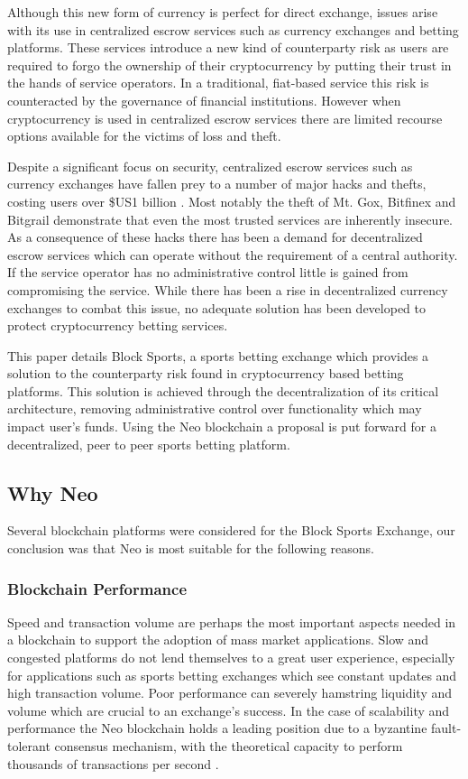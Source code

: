 \documentclass{article}
\begin{document}
Although this new form of currency is perfect for direct exchange, issues arise with its use in centralized escrow services such as currency exchanges and betting platforms. These services introduce a new kind of counterparty risk as users are required to forgo the ownership of their cryptocurrency by putting their trust in the hands of service operators. In a traditional, fiat-based service this risk is counteracted by the governance of financial institutions. However when cryptocurrency is used in centralized escrow services there are limited recourse options available for the victims of loss and theft.

Despite a significant focus on security, centralized escrow services such as currency exchanges have fallen prey to a number of major hacks and thefts, costing users over \$US1 billion \cite{hacks}. Most notably the theft of Mt. Gox, Bitfinex and Bitgrail demonstrate that even the most trusted services are inherently insecure. As a consequence of these hacks there has been a demand for decentralized escrow services which can operate without the requirement of a central authority. If the service operator has no administrative control little is gained from compromising the service. While there has been a rise in decentralized currency exchanges to combat this issue, no adequate solution has been developed to protect cryptocurrency betting services.

This paper details Block Sports, a sports betting exchange which provides a solution to the counterparty risk found in cryptocurrency based betting platforms. This solution is achieved through the decentralization of its critical architecture, removing administrative control over functionality which may impact user’s funds. Using the Neo blockchain a proposal is put forward for a decentralized, peer to peer sports betting platform.

	\subsection{Why Neo} \label{why-neo}
Several blockchain platforms were considered for the Block Sports Exchange, our conclusion was that Neo is most suitable for the following reasons.

		\subsubsection{Blockchain Performance} \label{blockchain-performance}
Speed and transaction volume are perhaps the most important aspects needed in a blockchain to support the adoption of mass market applications. Slow and congested platforms do not lend themselves to a great user experience, especially for applications such as sports betting exchanges which see constant updates and high transaction volume. Poor performance can severely hamstring liquidity and volume which are crucial to an exchange's success. In the case of scalability and performance the Neo blockchain holds a leading position due to a byzantine fault-tolerant consensus mechanism, with the theoretical capacity to perform thousands of transactions per second \cite{neo-whitepaper}.
\end{document}
